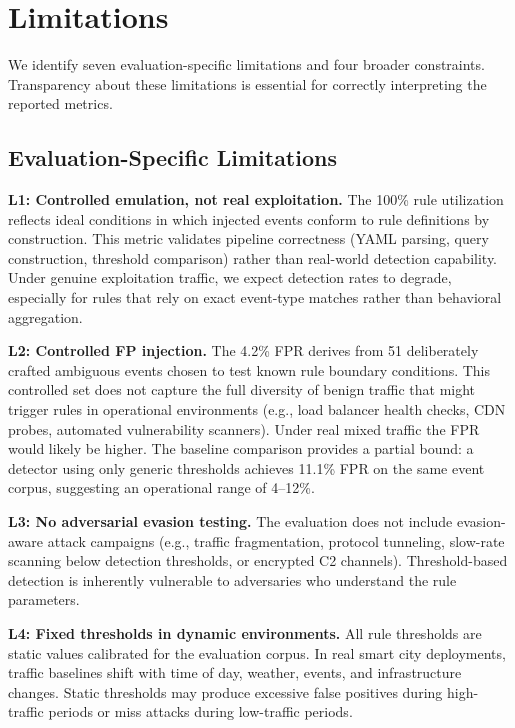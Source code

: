 \documentclass[conference,10pt]{IEEEtran}
\begin{document}
\section{Limitations}
\label{sec:limitations}

We identify seven evaluation-specific limitations and four broader constraints. Transparency about these limitations is essential for correctly interpreting the reported metrics.

\subsection{Evaluation-Specific Limitations}

\textbf{L1: Controlled emulation, not real exploitation.} The 100\% rule utilization reflects ideal conditions in which injected events conform to rule definitions by construction. This metric validates pipeline correctness (YAML parsing, query construction, threshold comparison) rather than real-world detection capability. Under genuine exploitation traffic, we expect detection rates to degrade, especially for rules that rely on exact event-type matches rather than behavioral aggregation.

\textbf{L2: Controlled FP injection.} The 4.2\% FPR derives from 51 deliberately crafted ambiguous events chosen to test known rule boundary conditions. This controlled set does not capture the full diversity of benign traffic that might trigger rules in operational environments (e.g., load balancer health checks, CDN probes, automated vulnerability scanners). Under real mixed traffic the FPR would likely be higher. The baseline comparison provides a partial bound: a detector using only generic thresholds achieves 11.1\% FPR on the same event corpus, suggesting an operational range of 4--12\%.

\textbf{L3: No adversarial evasion testing.} The evaluation does not include evasion-aware attack campaigns (e.g., traffic fragmentation, protocol tunneling, slow-rate scanning below detection thresholds, or encrypted C2 channels). Threshold-based detection is inherently vulnerable to adversaries who understand the rule parameters.

\textbf{L4: Fixed thresholds in dynamic environments.} All rule thresholds are static values calibrated for the evaluation corpus. In real smart city deployments, traffic baselines shift with time of day, weather, events, and infrastructure changes. Static thresholds may produce excessive false positives during high-traffic periods or miss attacks during low-traffic periods.
\end{document}
